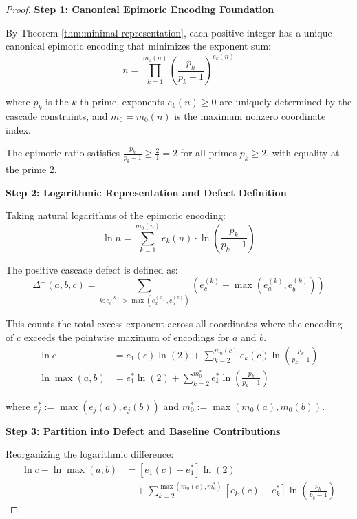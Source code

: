 \begin{proof}

\noindent \textbf{Step 1: Canonical Epimoric Encoding Foundation}

By Theorem \ref{thm:minimal-representation}, each positive integer has a unique canonical epimoric encoding that minimizes the exponent sum:
\begin{equation}
n = \prod_{k=1}^{m_0(n)} \left(\frac{p_k}{p_k - 1}\right)^{e_k(n)}
\end{equation}

where $p_k$ is the $k$-th prime, exponents $e_k(n) \geq 0$ are uniquely determined by the cascade constraints, and $m_0 = m_0(n)$ is the maximum nonzero coordinate index.

The epimoric ratio satisfies $\frac{p_k}{p_k-1} \geq \frac{2}{1} = 2$ for all primes $p_k \geq 2$, with equality at the prime 2.

\noindent \textbf{Step 2: Logarithmic Representation and Defect Definition}

Taking natural logarithms of the epimoric encoding:
\begin{equation}
\ln n = \sum_{k=1}^{m_0(n)} e_k(n) \cdot \ln\left(\frac{p_k}{p_k - 1}\right)
\end{equation}

The positive cascade defect is defined as:
\begin{equation}
\Delta^{+}(a,b,c) = \sum_{k: e_c^{(k)} > \max(e_a^{(k)}, e_b^{(k)})} (e_c^{(k)} - \max(e_a^{(k)}, e_b^{(k)}))
\end{equation}

This counts the total excess exponent across all coordinates where the encoding of $c$ exceeds the pointwise maximum of encodings for $a$ and $b$.
\begin{align}
\ln c &= e_1(c) \ln(2) + \sum_{k=2}^{m_0(c)} e_k(c) \ln\left(\frac{p_k}{p_k - 1}\right) \\
\ln \max(a,b) &= e_1^{*} \ln(2) + \sum_{k=2}^{m_0^{*}} e_k^{*} \ln\left(\frac{p_k}{p_k - 1}\right)
\end{align}

where $e_j^{*} := \max(e_j(a), e_j(b))$ and $m_0^{*} := \max(m_0(a), m_0(b))$.

\noindent \textbf{Step 3: Partition into Defect and Baseline Contributions}

Reorganizing the logarithmic difference:
\begin{align}
\ln c - \ln \max(a,b) &= \left[e_1(c) - e_1^{*}\right] \ln(2) \\
&\quad + \sum_{k=2}^{\max(m_0(c), m_0^{*})} \left[e_k(c) - e_k^{*}\right] \ln\left(\frac{p_k}{p_k - 1}\right)
\end{align}


\end{proof}
